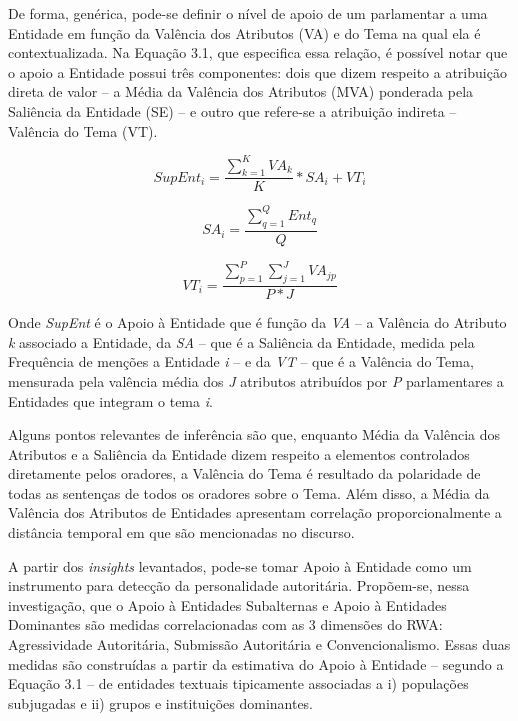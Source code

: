 \documentclass[
12pt,				%
openright,			%
twoside,			%
a4paper,			%
english,			%
french,				%
spanish,			%
brazil				%
]{abntex2}
\begin{document}
De forma, genérica, pode-se definir o nível de apoio de um parlamentar a uma Entidade em função da Valência dos Atributos (VA) e do Tema na qual ela é contextualizada. Na Equação 3.1, que especifica essa relação, é possível notar que o apoio a Entidade possui três componentes: dois que dizem respeito a atribuição direta de valor -- a Média da Valência dos Atributos (MVA) ponderada pela Saliência da Entidade (SE) -- e outro que refere-se a atribuição indireta -- Valência do Tema (VT).     

\begin{equation}
	SupEnt_i = \frac{\sum_{k = 1}^{K} VA_k}{K} * SA_i + VT_i
\end{equation}

\begin{equation}
SA_i = \frac{\sum_{q = 1}^{Q} Ent_q}{Q}
\end{equation}

\begin{equation}
VT_i = \frac{\sum_{p = 1}^{P} \sum_{j = 1}^{J} VA_{jp}}{P * J}
\end{equation}

Onde \emph{SupEnt} é o Apoio à Entidade que é função da \emph{VA} -- a Valência do Atributo \emph{k} associado a Entidade, da \emph{SA} -- que é a Saliência da Entidade, medida pela Frequência de menções a Entidade \emph{i} -- e da \emph{VT} -- que é a Valência do Tema, mensurada pela valência média dos \emph{J} atributos atribuídos por \emph{P} parlamentares a Entidades que integram o tema \emph{i}.

Alguns pontos relevantes de inferência são que, enquanto Média da Valência dos Atributos e a Saliência da Entidade dizem respeito a elementos controlados diretamente pelos oradores, a Valência do Tema é resultado da polaridade de todas as sentenças de todos os oradores sobre o Tema. Além disso, a Média da Valência dos Atributos de Entidades apresentam correlação proporcionalmente a distância temporal em que são mencionadas no discurso.  

A partir dos \emph{insights} levantados, pode-se tomar Apoio à Entidade como um instrumento para detecção da personalidade autoritária. Propõem-se, nessa investigação, que o Apoio à Entidades Subalternas e Apoio à Entidades Dominantes são medidas correlacionadas com as 3 dimensões do RWA: Agressividade Autoritária, Submissão Autoritária e Convencionalismo. Essas duas medidas são construídas a partir da estimativa do Apoio à Entidade -- segundo a Equação 3.1 -- de entidades textuais tipicamente associadas a i) populações subjugadas e ii) grupos e instituições dominantes.
\end{document}

